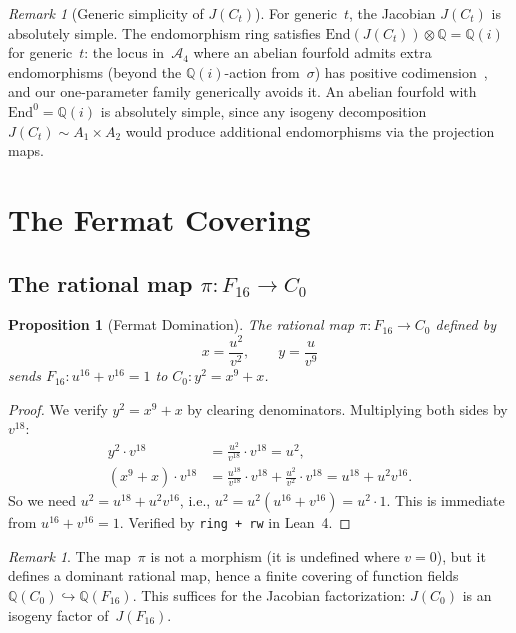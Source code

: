 \documentclass[11pt]{article}
\theoremstyle{plain}
\newtheorem{proposition}[theorem]{Proposition}
\theoremstyle{definition}
\theoremstyle{remark}
\newtheorem{remark}[theorem]{Remark}
\newcommand{\Q}{\mathbb{Q}}
\newcommand{\End}{\mathrm{End}}
\begin{document}
\begin{remark}[Generic simplicity of $J(C_t)$]\label{rmk:simple}
For generic~$t$, the Jacobian $J(C_t)$ is absolutely simple.
The endomorphism ring satisfies $\End(J(C_t)) \otimes \Q = \Q(i)$
for generic~$t$: the locus in~$\mathcal{A}_4$ where an abelian
fourfold admits extra endomorphisms (beyond the $\Q(i)$-action
from~$\sigma$) has positive codimension~\cite{Zarhin83,Mori81},
and our one-parameter family generically avoids it.
An abelian fourfold with $\End^0 = \Q(i)$ is absolutely
simple, since any isogeny decomposition
$J(C_t) \sim A_1 \times A_2$ would produce additional
endomorphisms via the projection maps.
\end{remark}

\section{The Fermat Covering}
\label{sec:fermat}

\subsection{The rational map $\pi\colon F_{16} \to C_0$}

\begin{proposition}[Fermat Domination]\label{prop:fermat}
The rational map $\pi\colon F_{16} \to C_0$ defined by
\[
  x = \frac{u^2}{v^2}, \qquad y = \frac{u}{v^9}
\]
sends $F_{16}\colon u^{16} + v^{16} = 1$ to
$C_0\colon y^2 = x^9 + x$.
\end{proposition}

\begin{proof}
We verify $y^2 = x^9 + x$ by clearing denominators.
Multiplying both sides by $v^{18}$:
\begin{align*}
  y^2 \cdot v^{18} &= \frac{u^2}{v^{18}} \cdot v^{18} = u^2, \\
  (x^9 + x) \cdot v^{18} &= \frac{u^{18}}{v^{18}} \cdot v^{18}
    + \frac{u^2}{v^2} \cdot v^{18}
    = u^{18} + u^2 v^{16}.
\end{align*}
So we need $u^2 = u^{18} + u^2 v^{16}$, i.e.,
$u^2 = u^2(u^{16} + v^{16}) = u^2 \cdot 1$.
This is immediate from $u^{16} + v^{16} = 1$.
Verified by \texttt{ring + rw} in Lean~4.
\end{proof}

\begin{remark}
The map~$\pi$ is not a morphism (it is undefined where $v = 0$),
but it defines a dominant rational map, hence a finite covering of
function fields $\Q(C_0) \hookrightarrow \Q(F_{16})$.  This suffices
for the Jacobian factorization: $J(C_0)$ is an isogeny factor
of~$J(F_{16})$.
\end{remark}
\end{document}
